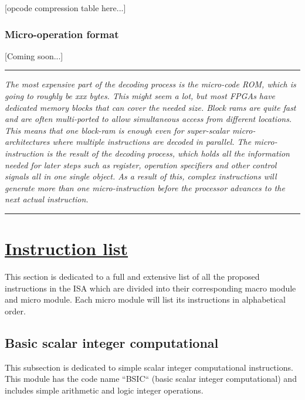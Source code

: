 \documentclass{article}
\begin{document}
                [opcode compression table here...]

            \subsubsection{Micro-operation format}

                [Coming soon...]

        \par\noindent\rule{\textwidth}{0.4pt}
        \textit{The most expensive part of the decoding process is the micro-code ROM, which is going to roughly be xxx bytes. This might seem a lot, but most FPGAs have dedicated memory blocks that can cover the needed size. Block rams are quite fast and are often multi-ported to allow simultaneous access from different locations. This means that one block-ram is enough even for super-scalar micro-architectures where multiple instructions are decoded in parallel. The micro-instruction is the result of the decoding process, which holds all the information needed for later steps such as register, operation specifiers and other control signals all in one single object. As a result of this, complex instructions will generate more than one micro-instruction before the processor advances to the next actual instruction.}
        \par\noindent\rule{\textwidth}{0.4pt}

    \clearpage


    \section[Instruction list]{\LARGE\underline{Instruction list}} %

        This section is dedicated to a full and extensive list of all the proposed instructions in the ISA which are divided into their corresponding macro module and micro module. Each micro module will list its instructions in alphabetical order.

        \subsection{Basic scalar integer computational}

            This subsection is dedicated to simple scalar integer computational instructions. This module has the code name ``BSIC`` (basic scalar integer computational) and includes simple arithmetic and logic integer operations.
\end{document}
